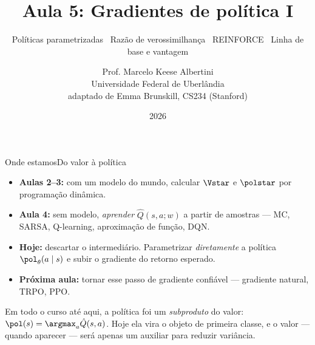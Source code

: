 \documentclass[aspectratio=169, 11pt]{beamer}
\title[Aula 5 — Gradientes de política I]{Aula 5: Gradientes de política I}
\subtitle[Aprendizagem por Reforço]{Políticas parametrizadas \textbullet\ Razão de verossimilhança \textbullet\ REINFORCE \textbullet\ Linha de base e vantagem}
\author[Prof. Marcelo K. Albertini]{Prof. Marcelo Keese Albertini \\
  \footnotesize Universidade Federal de Uberlândia \\
  \footnotesize adaptado de Emma Brunskill, CS234 (Stanford)}
\institute{Universidade Federal de Uberlândia}
\date{2026}
\newcommand{\thv}{\theta}                       %
\newcommand{\wv}{w}                             %
\newcommand{\polth}{\pol_{\thv}}                %
\newcommand{\Qhat}{\hat{Q}}
\begin{document}
\begin{frame}\titlepage\end{frame}

\begin{frame}{Onde estamos}{Do valor à política}

  \begin{itemize}\setlength{\itemsep}{0.5ex}
    \item \textbf{Aulas 2--3:} com um modelo do mundo, calcular $\Vstar$ e
      $\polstar$ por programação dinâmica.
    \item \textbf{Aula 4:} sem modelo, \emph{aprender} $\Qhat(s,a;\wv)$ a partir
      de amostras --- MC, SARSA, Q-learning, aproximação de função, DQN.
    \item \textbf{Hoje:} descartar o intermediário. Parametrizar
      \emph{diretamente} a política $\polth(a\mid s)$ e subir o gradiente do
      retorno esperado.
    \item \textbf{Próxima aula:} tornar esse passo de gradiente confiável ---
      gradiente natural, TRPO, PPO.
  \end{itemize}

  \begin{ideiabox}
    Em todo o curso até aqui, a política foi um \emph{subproduto} do valor:
    $\pol(s) = \argmax_a \Qhat(s,a)$. Hoje ela vira o objeto de primeira
    classe, e o valor --- quando aparecer --- será apenas um auxiliar para
    reduzir variância.
  \end{ideiabox}
\end{frame}
\end{document}
